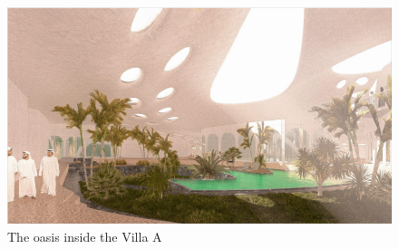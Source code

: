 \begin{figure}[H]
	\centering
	\includegraphics[width=\linewidth]{src/graphics/riyadh-dream-villas--perspective-03.jpg}
	\caption*{%
		The oasis inside the Villa A%
	}
	\label{
		fig:riyadh-dream-villas--perspective-03
	}
\end{figure}
